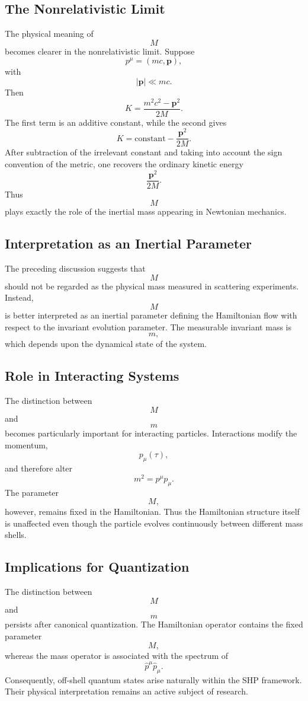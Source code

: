 \subsection{The Nonrelativistic Limit}
The physical meaning of
\[M\]
becomes clearer in the nonrelativistic limit.
Suppose
\[p^\mu=(mc,\mathbf p),\]
with
\[|\mathbf p|\ll mc.\]
Then
\[K=\frac{m^2c^2-\mathbf p^2}{2M}.\]
The first term is an additive constant,
while the second gives
\[K=\mathrm{constant}-\frac{\mathbf p^2}{2M}.\]
After subtraction of the irrelevant constant and taking into account the
sign convention of the metric, one recovers the ordinary kinetic energy
\[\frac{\mathbf p^2}{2M}.\]
Thus
\[M\]
plays exactly the role of the inertial mass appearing in Newtonian
mechanics.
\subsection{Interpretation as an Inertial Parameter}
The preceding discussion suggests that
\[M\]
should not be regarded as the physical mass measured in scattering
experiments.
Instead,
\[M\]
is better interpreted as an inertial parameter defining the Hamiltonian
flow with respect to the invariant evolution parameter.
The measurable invariant mass is
\[m,\]
which depends upon the dynamical state of the system.
\subsection{Role in Interacting Systems}
The distinction between
\[M\]
and
\[m\]
becomes particularly important for interacting particles.
Interactions modify the momentum,
\[p_\mu(\tau),\]
and therefore alter
\[m^2=p^\mu p_\mu.\]
The parameter
\[M,\]
however, remains fixed in the Hamiltonian.
Thus the Hamiltonian structure itself is unaffected even though the
particle evolves continuously between different mass shells.
\subsection{Implications for Quantization}
The distinction between
\[M\]
and
\[m\]
persists after canonical quantization.
The Hamiltonian operator contains the fixed parameter
\[M,\]
whereas the mass operator is associated with the spectrum of
\[\hat p^\mu \hat p_\mu.\]
Consequently, off-shell quantum states arise naturally within the SHP
framework.
Their physical interpretation remains an active subject of research.
